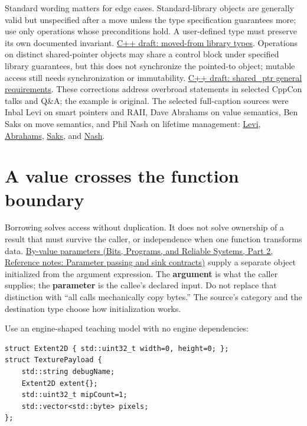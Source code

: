 Standard wording matters for edge cases. Standard-library objects are generally valid but unspecified after a move unless the type specification guarantees more; use only operations whose preconditions hold. A user-defined type must preserve its own documented invariant. \href{https://eel.is/c++draft/lib.types.movedfrom}{C++ draft: moved-from library types}. Operations on distinct shared-pointer objects may share a control block under specified library guarantees, but this does not synchronize the pointed-to object; mutable access still needs synchronization or immutability. \href{https://eel.is/c++draft/util.smartptr.shared}{C++ draft: shared\_ptr general requirements}. These corrections address overbroad statements in selected CppCon talks and Q\&A; the example is original. The selected full-caption sources were Inbal Levi on smart pointers and RAII, Dave Abrahams on value semantics, Ben Saks on move semantics, and Phil Nash on lifetime management: \href{https://www.youtube.com/watch?v=07rJOzFRs6M}{Levi}, \href{https://www.youtube.com/watch?v=QthAU-t3PQ4}{Abrahams}, \href{https://www.youtube.com/watch?v=szU5b972F7E}{Saks}, and \href{https://www.youtube.com/watch?v=aMvIv6blzBs}{Nash}.

\section{A value crosses the function boundary}\label{05-engine-i-ch003-a-value-crosses-the-function-boundary}

\hypertarget{05-engine-i-ch003-a-value-crosses-the-function-boundary}{}

Borrowing solves access without duplication. It does not solve ownership of a result that must survive the caller, or independence when one function transforms data. \href{../01-Bits-Programs-and-Reliable-Systems-P02/main.pdf\#nameddest=appendix-d5908f75721f}{By-value parameters (Bits, Programs, and Reliable Systems, Part 2, Reference notes: Parameter passing and sink contracts)} supply a separate object initialized from the argument expression. The \textbf{argument} is what the caller supplies; the \textbf{parameter} is the callee's declared input. Do not replace that distinction with ``all calls mechanically copy bytes.'' The source's category and the destination type choose how initialization works.

Use an engine-shaped teaching model with no engine dependencies:

\begin{verbatim}
struct Extent2D { std::uint32_t width=0, height=0; };
struct TexturePayload {
    std::string debugName;
    Extent2D extent{};
    std::uint32_t mipCount=1;
    std::vector<std::byte> pixels;
};
\end{verbatim}

